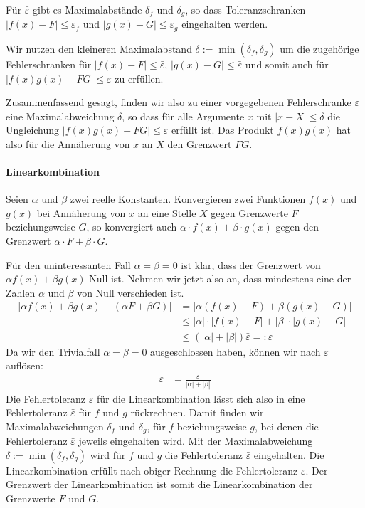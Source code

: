 \documentclass{article}
\let\eps\varepsilon
\begin{document}
Für $\bar\eps$ gibt es Maximalabstände $\delta_f$ und $\delta_g$,
so dass Toleranzschranken $|f(x)-F|\leq \eps_f$ und
$|g(x)-G|\leq \eps_g$ eingehalten werden.

Wir nutzen den kleineren Maximalabstand
$\delta:=\min(\delta_f,\delta_g)$ um die zugehörige Fehlerschranken
für $|f(x)-F|\leq \bar\eps$, $|g(x)-G|\leq\bar\eps$ und somit auch für
$|f(x)g(x)-FG|\leq\eps$ zu erfüllen.

Zusammenfassend gesagt, finden wir also zu einer vorgegebenen
Fehlerschranke $\eps$ eine Maximalabweichung $\delta$, so dass für
alle Argumente $x$ mit $|x-X|\leq \delta$ die Ungleichung
$|f(x)g(x)-FG|\leq\eps$ erfüllt ist. Das Produkt $f(x)g(x)$ hat also
für die Annäherung von $x$ an $X$ den Grenzwert $FG$.

\paragraph{Linearkombination}
Seien $\alpha$ und $\beta$ zwei reelle Konstanten.  Konvergieren zwei
Funktionen $f(x)$ und $g(x)$ bei Annäherung von $x$ an eine Stelle $X$
gegen Grenzwerte $F$ beziehungsweise $G$, so konvergiert auch
$\alpha\cdot f(x)+\beta\cdot g(x)$ gegen den Grenzwert $\alpha\cdot F+\beta\cdot G$.

Für den uninteressanten Fall $\alpha=\beta=0$ ist klar, dass der
Grenzwert von $\alpha f(x) + \beta g(x)$ Null ist.  Nehmen wir jetzt
also an, dass mindestens eine der Zahlen $\alpha$ und $\beta$ von Null
verschieden ist.
\begin{align*}
  |\alpha f(x) + \beta g(x) - (\alpha F + \beta G)| &= |\alpha (f(x)-F) + \beta (g(x)-G)|\\
                                                    &\leq |\alpha|\cdot |f(x)-F| + |\beta|\cdot |g(x) - G|\\
                                                    &\leq (|\alpha|+|\beta|)\bar\eps=:\eps
\end{align*}
Da wir den Trivialfall $\alpha=\beta=0$ ausgeschlossen haben, können
wir nach $\bar\eps$ auflösen:
\begin{align*}
  \bar\eps &= \frac{\eps}{|\alpha|+|\beta|}
\end{align*}
Die Fehlertoleranz $\eps$ für die Linearkombination lässt sich also in
eine Fehlertoleranz $\bar\eps$ für $f$ und $g$ rückrechnen.  Damit
finden wir Maximalabweichungen $\delta_f$ und $\delta_g$, für $f$
beziehungsweise $g$, bei denen die Fehlertoleranz $\bar\eps$ jeweils
eingehalten wird.  Mit der Maximalabweichung
$\delta:=\min(\delta_f,\delta_g)$ wird für $f$ und $g$ die
Fehlertoleranz $\bar\eps$ eingehalten.  Die Linearkombination erfüllt
nach obiger Rechnung die Fehlertoleranz $\eps$. Der Grenzwert der
Linearkombination ist somit die Linearkombination der Grenzwerte $F$ und $G$.
\end{document}

